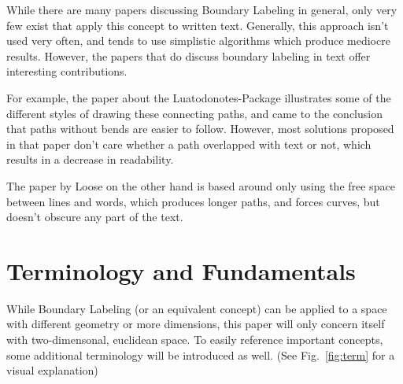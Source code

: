\documentclass[11pt,a4paper]{vutinfth}
\begin{document}
While there are many papers discussing Boundary Labeling in general, only very few exist that apply this concept to written text. Generally, this approach isn't used very often, and tends to use simplistic algorithms which produce mediocre results. %
However, the papers that do discuss boundary labeling in text offer interesting contributions.

For example, the paper about the Luatodonotes-Package\cite{Kindermann2014} illustrates some of the different styles of drawing these connecting paths, and came to the conclusion that paths without bends are easier to follow. %
However, most solutions proposed in that paper don't care whether a path overlapped with text or not, which results in a decrease in readability.

The paper by Loose\cite{Loose2015} on the other hand is based around only using the free space between lines and words, which produces longer paths, and forces curves, but doesn't obscure any part of the text.



\section{Terminology and Fundamentals} %
While Boundary Labeling (or an equivalent concept) can be applied to a space with different geometry or more dimensions, this paper will only concern itself with two-dimensonal, euclidean space.
To easily reference important concepts, some additional terminology will be introduced as well. (See Fig.~\ref{fig:term} for a visual explanation)%

\end{document}

